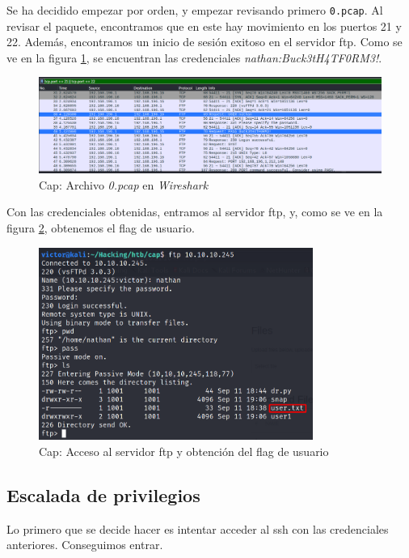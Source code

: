 Se ha decidido empezar por orden, y empezar revisando primero \texttt{0.pcap}. Al revisar el paquete, encontramos que en este hay movimiento en los puertos 21 y 22. Además, encontramos un inicio de sesión exitoso en el servidor \acrshort{ftp}. Como se ve en la figura \ref{fig:cap-wire-0}, se encuentran las credenciales \textit{nathan:Buck3tH4TF0RM3!}.\\
\begin{figure}[h]
    \centering
    \includegraphics[width=1.0\textwidth]{images/machines/cap/wireshark-0.png}
    \caption{Cap: Archivo \textit{0.pcap} en \textit{Wireshark}}
    \label{fig:cap-wire-0}
\end{figure}

Con las credenciales obtenidas, entramos al servidor \acrshort{ftp}, y, como se ve en la figura \ref{fig:cap-user-flag}, obtenemos el flag de usuario.
\begin{figure}[h]
    \centering
    \includegraphics[width=0.8\textwidth]{images/machines/cap/user-flag.png}
    \caption{Cap: Acceso al servidor \acrshort{ftp} y obtención del flag de usuario}
    \label{fig:cap-user-flag}
\end{figure}

\subsection{Escalada de privilegios}

Lo primero que se decide hacer es intentar acceder al \acrshort{ssh} con las credenciales anteriores. Conseguimos entrar.\\


